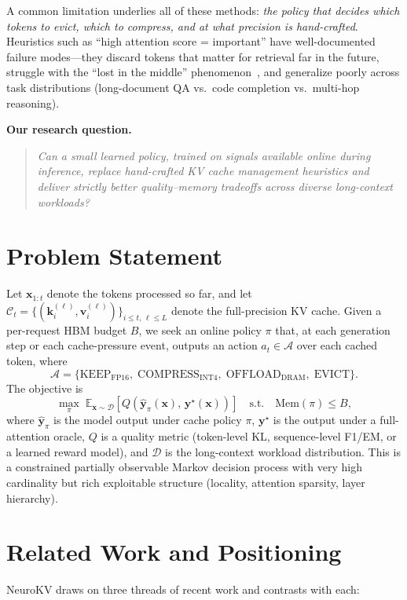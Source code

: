\documentclass[journal]{IEEEtran}
\begin{document}
A common limitation underlies all of these methods: \emph{the policy that decides which tokens to evict, which to compress, and at what precision is hand-crafted}. Heuristics such as ``high attention score = important'' have well-documented failure modes---they discard tokens that matter for retrieval far in the future, struggle with the ``lost in the middle'' phenomenon~\cite{liu2023lostmiddle}, and generalize poorly across task distributions (long-document QA vs.\ code completion vs.\ multi-hop reasoning).

\textbf{Our research question.}
\begin{quote}
\emph{Can a small learned policy, trained on signals available online during inference, replace hand-crafted KV cache management heuristics and deliver strictly better quality--memory tradeoffs across diverse long-context workloads?}
\end{quote}

\section{Problem Statement}
\label{sec:problem}
Let $\mathbf{x}_{1{:}t}$ denote the tokens processed so far, and let $\mathcal{C}_t = \{(\mathbf{k}_i^{(\ell)},\mathbf{v}_i^{(\ell)})\}_{i \le t,\,\ell \le L}$ denote the full-precision KV cache. Given a per-request HBM budget $B$, we seek an online policy $\pi$ that, at each generation step or each cache-pressure event, outputs an action $a_t \in \mathcal{A}$ over each cached token, where
\[
\mathcal{A} = \{\mathrm{KEEP_{FP16}},\;\mathrm{COMPRESS_{INT4}},\;\mathrm{OFFLOAD_{DRAM}},\;\mathrm{EVICT}\}.
\]
The objective is
\begin{equation}
\max_{\pi}\;\mathbb{E}_{\mathbf{x}\sim\mathcal{D}}\left[Q(\hat{\mathbf{y}}_\pi(\mathbf{x}),\,\mathbf{y}^\star(\mathbf{x}))\right] \quad \text{s.t.}\quad \mathrm{Mem}(\pi) \le B,
\label{eq:objective}
\end{equation}
where $\hat{\mathbf{y}}_\pi$ is the model output under cache policy $\pi$, $\mathbf{y}^\star$ is the output under a full-attention oracle, $Q$ is a quality metric (token-level KL, sequence-level F1/EM, or a learned reward model), and $\mathcal{D}$ is the long-context workload distribution. This is a constrained partially observable Markov decision process with very high cardinality but rich exploitable structure (locality, attention sparsity, layer hierarchy).

\section{Related Work and Positioning}
\label{sec:related}
NeuroKV draws on three threads of recent work and contrasts with each:
\end{document}
